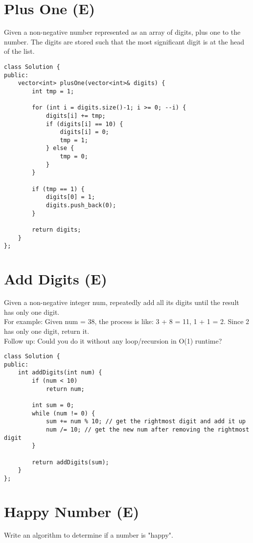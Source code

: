 \section{Plus One (E)}
Given a non-negative number represented as an array of digits, plus one to the number. The digits are stored such that the most significant digit is at the head of the list. \\

\begin{lstlisting}
class Solution {
public:
    vector<int> plusOne(vector<int>& digits) {
        int tmp = 1;
        
        for (int i = digits.size()-1; i >= 0; --i) {
            digits[i] += tmp;
            if (digits[i] == 10) {
                digits[i] = 0;
                tmp = 1;
            } else {
                tmp = 0;
            }
        }
        
        if (tmp == 1) {
            digits[0] = 1;
            digits.push_back(0);
        }
        
        return digits;
    }
};
\end{lstlisting}


\section{Add Digits (E)}
Given a non-negative integer num, repeatedly add all its digits until the result has only one digit.\\

For example:
Given num = 38, the process is like: 3 + 8 = 11, 1 + 1 = 2. Since 2 has only one digit, return it.\\

Follow up:
Could you do it without any loop/recursion in O(1) runtime? \\

\begin{lstlisting}
class Solution {
public:
    int addDigits(int num) {
        if (num < 10)
            return num;
        
        int sum = 0;
        while (num != 0) {
            sum += num % 10; // get the rightmost digit and add it up
            num /= 10; // get the new num after removing the rightmost digit
        }
        
        return addDigits(sum);
    }
};
\end{lstlisting}


\section{Happy Number (E)}
Write an algorithm to determine if a number is "happy".\\

